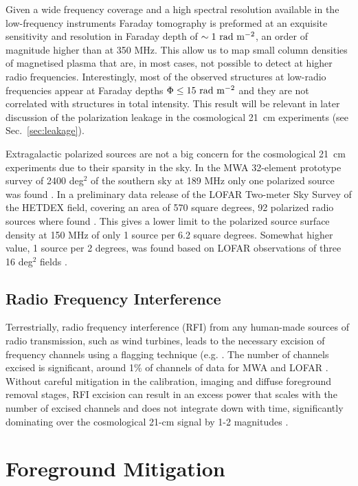 Given a wide frequency coverage and a high spectral resolution available in the low-frequency instruments Faraday tomography is preformed at an exquisite sensitivity and resolution in Faraday depth of $\sim1~{\rm rad~m^{-2}}$, an order of magnitude higher than at 350 MHz. This allow us to map small column densities of magnetised plasma that are, in most cases, not possible to detect at higher radio frequencies. Interestingly, most of the observed structures at low-radio frequencies appear at Faraday depths $\Phi\leq15~{\rm rad~m^{-2}}$ and they are not correlated with structures in total intensity. This result will be relevant in later discussion of the polarization leakage in the cosmological 21~cm experiments (see Sec.~\ref{sec:leakage}).

Extragalactic polarized sources are not a big concern for the cosmological 21~cm experiments due to their sparsity in the sky. In the MWA 32-element prototype survey of 2400 deg$^2$ of the southern sky at 189 MHz only one polarized source was found \cite{bernardi13}. In a preliminary data release of the LOFAR Two-meter Sky Survey of the HETDEX field, covering an area of 570 square degrees, 92 polarized radio sources where found \cite{vaneck18}. This gives a lower limit to the polarized source surface density at 150 MHz of only 1 source per 6.2 square degrees. Somewhat higher value, 1 source per 2 degrees, was found based on LOFAR observations of three 16 deg$^2$ fields \cite{jelic15, mulcahy14, vaneck18}.

\subsection{Radio Frequency Interference}
Terrestrially, radio frequency interference (RFI) from any human-made sources of radio transmission, such as wind turbines, leads to the necessary excision of frequency channels using a flagging technique (e.g. \cite{Offringa2012, Prasad2012ExA....33..157P}. The number of channels excised is significant, around 1$\%$ of channels of data for MWA and LOFAR \cite{Offringa2019MNRAS.484.2866O,Offringa2015PASA...32....8O}. Without careful mitigation in the calibration, imaging and diffuse foreground removal stages, RFI excision can result in an excess power that scales with the number of excised channels and does not integrate down with time, significantly dominating over the cosmological 21-cm signal by 1-2 magnitudes \cite{Offringa2019MNRAS.484.2866O}.
 
\section{Foreground Mitigation}\label{sec:fgmit}

